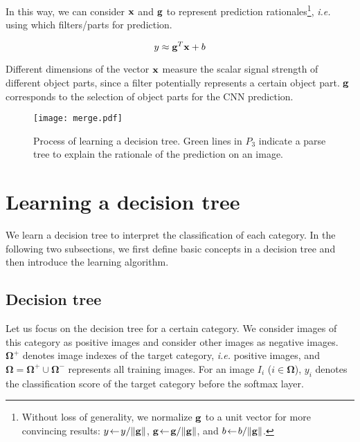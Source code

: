 \documentclass[10pt,twocolumn,letterpaper]{article}
\begin{document}
In this way, we can consider {\small${\bf x}$} and {\small${\bf g}$} to represent prediction rationales\footnote[4]{Without loss of generality, we normalize ${\bf g}$ to a unit vector for more convincing results: {$y\!\leftarrow\!{y}/{\Vert{\bf g}\Vert}$}, {${\bf g}\!\leftarrow\!{{\bf g}}/{\Vert{\bf g}\Vert}$}, and {$b\!\leftarrow\!{b}/{\Vert{\bf g}\Vert}$}.}, \emph{i.e.} using which filters/parts for prediction.
\begin{small}
\begin{equation}
y\approx{\bf g}^{T}{\bf x}+b\label{eqn:rationale}
\end{equation}
\end{small}
Different dimensions of the vector {\small${\bf x}$} measure the scalar signal strength of different object parts, since a filter potentially represents a certain object part. {\small${\bf g}$} corresponds to the selection of object parts for the CNN prediction.

\begin{figure}[t]
\centering
\texttt{[image: merge.pdf]}
\caption{Process of learning a decision tree. Green lines in $P_{3}$ indicate a parse tree to explain the rationale of the prediction on an image.}
\label{fig:merge}
\end{figure}

\section{Learning a decision tree}

We learn a decision tree to interpret the classification of each category. In the following two subsections, we first define basic concepts in a decision tree and then introduce the learning algorithm.

\subsection{Decision tree}

Let us focus on the decision tree for a certain category. We consider images of this category as positive images and consider other images as negative images. {\small${\boldsymbol\Omega}^{+}$} denotes image indexes of the target category, \emph{i.e.} positive images, and {\small${\boldsymbol\Omega}={\boldsymbol\Omega}^{+}\cup{\boldsymbol\Omega}^{-}$} represents all training images. For an image {\small$I_{i}$} ({\small$i\in{\boldsymbol\Omega}$}), $y_{i}$ denotes the classification score of the target category before the softmax layer.
\end{document}
